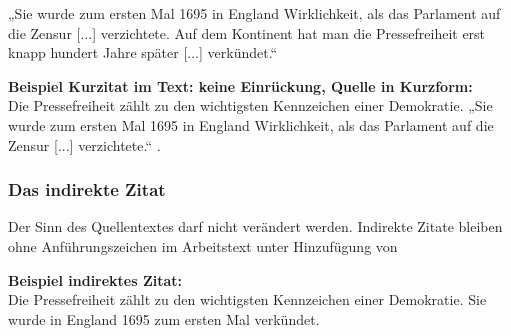 \documentclass[a4paper, 12pt, xcolor=dvipsnames]{scrartcl}	%
\begin{document}
\vspace{-0.3cm}																	%

\hspace{1.0cm}																	%
\begin{minipage}{0.935\textwidth}
\linespread {1.25}
„Sie wurde zum ersten Mal 1695 in England Wirklichkeit, als das Parlament auf die Zensur [...]
verzichtete. Auf dem Kontinent hat man die Pressefreiheit erst knapp hundert Jahre später
[...] verkündet.“ \cite[S~105]{11_Killinger}
\end{minipage}
\vspace{0.5cm}																	%
%

\textbf{Beispiel Kurzitat im Text: keine Einrückung, Quelle in Kurzform:}\\
Die Pressefreiheit zählt zu den wichtigsten Kennzeichen einer Demokratie. „Sie wurde zum ersten Mal
1695 in England Wirklichkeit, als das Parlament auf die Zensur [...] verzichtete.“ \cite[S~12]{12_MM}. %

\subsubsection{Das indirekte Zitat}										%
\begin{Merksatz}
Der Sinn des Quellentextes darf nicht verändert werden. Indirekte Zitate bleiben ohne Anführungszeichen im Arbeitstext unter Hinzufügung von \cite{BlindzitatKurzzeichen_1}			%
\end{Merksatz}
%

\textbf{Beispiel indirektes Zitat:}\\
Die Pressefreiheit zählt zu den wichtigsten Kennzeichen einer Demokratie. Sie wurde in England
1695 zum ersten Mal verkündet. \cite[S~333]{BlindzitatKurzzeichen_1} %
				
\end{document}
